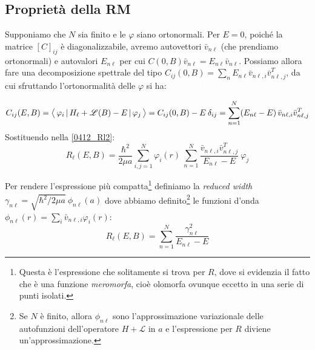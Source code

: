 \subsection{Proprietà della RM}
Supponiamo che $N$ sia finito e le $\varphi$ siano ortonormali. Per $E=0$, poiché la matrice $[C]_{ij}$ è diagonalizzabile, avremo autovettori $\bar{v}_{n\ell}$ (che prendiamo ortonormali) e autovalori $E_{n\ell}$ per cui $C(0,B)\bar{v}_{n\ell} = E_{n\ell} \bar{v}_{n\ell}$. Possiamo allora fare una decomposizione spettrale del tipo $C_{ij}(0,B) = \sum_n E_{n\ell} \bar{v}_{n\ell,i} \bar{v}^T_{n\ell,j}$, da cui sfruttando l'ortonormalità delle $\varphi$ si ha:

$$ C_{ij}(E,B) = \bigl\langle\, \varphi_i\, |\,H_\ell + \mathscr{L}(B) - E\, |\,\varphi_j\, \bigr\rangle = C_{ij}(0,B) - E\: \delta_{ij} = \sum_{n=1}^N (E_{n\ell} - E)\, \bar{v}_{n\ell,i}\bar{v}^T_{n\ell,j}$$
Sostituendo nella \eqref{0412_Rl2}:
$$R_\ell (E,B) = \frac{\hbar^2}{2\mu a} \sum_{i,j =1}^N \varphi_i(r) \: \sum_{n=1}^{N} \frac{\bar{v}_{n\ell,i}\bar{v}^T_{n\ell,j}}{E_{n\ell}-E} \: \varphi_j$$ 

\noindent Per rendere l'espressione più compatta\footnote{Questa è l'espressione che solitamente si trova per $R$, dove si evidenzia il fatto che è una funzione \textit{meromorfa}, cioè olomorfa ovunque eccetto in una serie di punti isolati.} definiamo la \textit{reduced width} $\gamma_{n\ell} = \sqrt{\hbar^2/2\mu a} \: \phi_{n\ell}(a)$ dove abbiamo definito\footnote{Se $N$ è finito, allora $\phi_{n\ell}$ sono l'approssimazione variazionale delle autofunzioni dell'operatore $H+\mathscr{L}$ in $a$ e l'espressione per $R$ diviene un'approssimazione.} le funzioni d'onda $\phi_{n\ell}(r) = \sum_i \bar{v}_{n\ell,i}\varphi_i(r)$:
\begin{equation}\label{0412_Rl3}
R_\ell (E,B) = \sum_{n=1}^N \frac{\gamma_{n\ell}^2}{E_{n\ell}-E}	
\end{equation}


